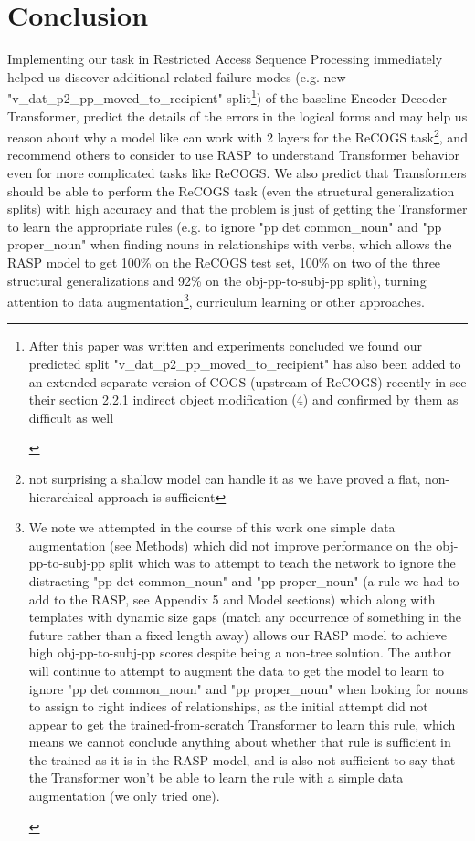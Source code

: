 \documentclass[11pt]{article}
\begin{document}
\section{Conclusion} 
Implementing our task in Restricted Access Sequence Processing immediately helped us discover additional related failure modes (e.g. new "v\_dat\_p2\_pp\_moved\_to\_recipient" split\footnote{
\begin{tiny}
After this paper was written and experiments concluded we found our predicted split "v\_dat\_p2\_pp\_moved\_to\_recipient" has also been added to an extended separate version of COGS (upstream of ReCOGS) recently in \cite{li2023slogstructuralgeneralizationbenchmark} see their section 2.2.1 indirect object modification (4) and confirmed by them as difficult as well
\end{tiny}
}) of the baseline Encoder-Decoder Transformer, predict the details of the errors in the logical forms and may help us reason about why a model like \cite{Wu2023} can work with 2 layers for the ReCOGS task\footnote{not surprising a shallow model can handle it as we have proved a flat, non-hierarchical approach is sufficient}, and recommend others to consider to use RASP to understand Transformer behavior even for more complicated tasks like ReCOGS. We also predict that Transformers should be able to perform the ReCOGS task (even the structural generalization splits) with high accuracy and that the problem is just of getting the Transformer to learn the appropriate rules (e.g. to ignore "pp det common\_noun" and "pp proper\_noun" when finding nouns in relationships with verbs, which allows the RASP model to get 100\% on the ReCOGS test set, 100\% on two of the three structural generalizations and 92\% on the obj-pp-to-subj-pp split), turning attention to data augmentation\footnote{
\begin{tiny}
We note we attempted in the course of this work one simple data augmentation (see Methods) which did not improve performance on the obj-pp-to-subj-pp split which was to attempt to teach the network to ignore the distracting "pp det common\_noun" and "pp proper\_noun" (a rule we had to add to the RASP, see Appendix 5 and Model sections) which along with templates with dynamic size gaps (match any occurrence of something in the future rather than a fixed length away) allows our RASP model to achieve high obj-pp-to-subj-pp scores despite being a non-tree solution. The author will continue to attempt to augment the data to get the model to learn to ignore "pp det common\_noun" and "pp proper\_noun" when looking for nouns to assign to right indices of relationships, as the initial attempt did not appear to get the trained-from-scratch Transformer to learn this rule, which means we cannot conclude anything about whether that rule is sufficient in the trained as it is in the RASP model, and is also not sufficient to say that the Transformer won't be able to learn the rule with a simple data augmentation (we only tried one).
\end{tiny}
}, curriculum learning or other approaches.
\end{document}
